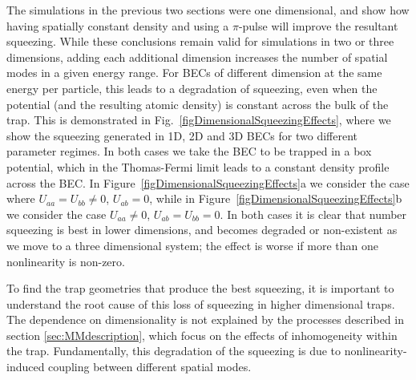 \documentclass{iopart}
\begin{document}
The simulations in the previous two sections were one dimensional, and show how having spatially constant density and using a $\pi$-pulse will improve the resultant squeezing.  While these conclusions remain valid for simulations in two or three dimensions, adding each additional dimension increases the number of spatial modes in a given energy range.  For BECs of different dimension at the same energy per particle, this leads to a degradation of squeezing, even when the potential (and the resulting atomic density) is constant across the bulk of the trap.  This is demonstrated in Fig.~\ref{figDimensionalSqueezingEffects}, where we show the squeezing generated in 1D, 2D and 3D BECs for two different parameter regimes. In both cases we take the BEC to be trapped in a box potential, which in the Thomas-Fermi limit leads to a constant density profile across the BEC. In Figure~\ref{figDimensionalSqueezingEffects}a we consider the case where $U_{aa}=U_{bb}\neq 0$, $U_{ab}=0$, while in Figure~\ref{figDimensionalSqueezingEffects}b we consider the case $U_{aa}\neq 0$, $U_{ab}=U_{bb}=0$. In both cases it is clear that number squeezing is best in lower dimensions, and becomes degraded or non-existent as we move to a three dimensional system; the effect is worse if more than one nonlinearity is non-zero.

To find the trap geometries that produce the best squeezing, it is important to understand the root cause of this loss of squeezing in higher dimensional traps.  The dependence on dimensionality is not explained by the processes described in section \ref{sec:MMdescription}, which focus on the effects of inhomogeneity within the trap.  Fundamentally, this degradation of the squeezing is due to nonlinearity-induced coupling between different spatial modes.  
\end{document}
